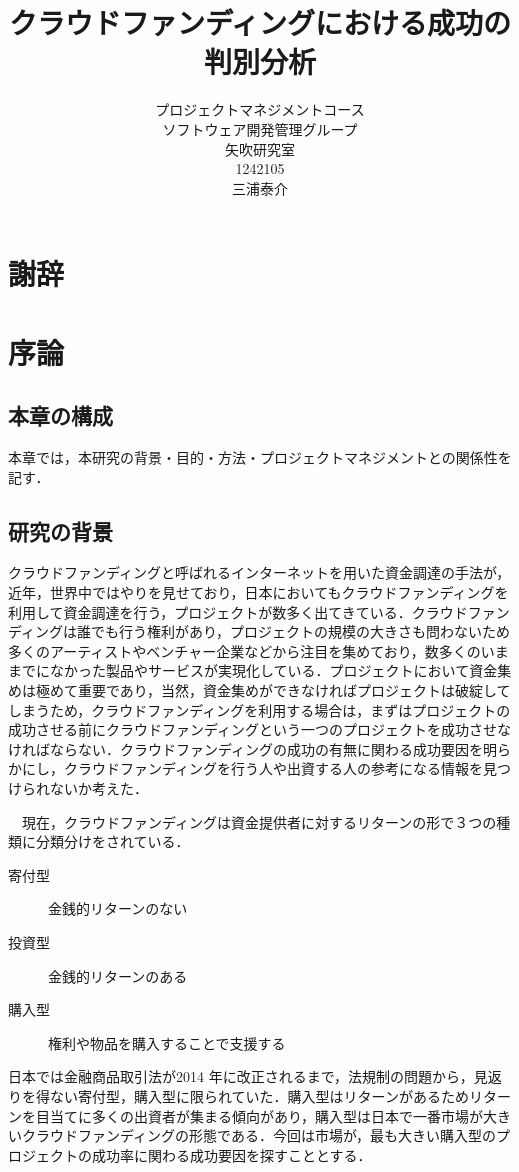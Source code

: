 \title{クラウドファンディングにおける成功の判別分析}
\author{プロジェクトマネジメントコース\\
ソフトウェア開発管理グループ\\
矢吹研究室\\
1242105\\
三浦泰介}
\date{}

\maketitle

\chapter*{謝辞}

\tableofcontents%

\chapter{序論}
\section{本章の構成}
本章では，本研究の背景・目的・方法・プロジェクトマネジメントとの関係性を記す．
\section{研究の背景}
クラウドファンディングと呼ばれるインターネットを用いた資金調達の手法が，近年，世界中ではやりを見せており，日本においてもクラウドファンディングを利用して資金調達を行う，プロジェクトが数多く出てきている．クラウドファンディングは誰でも行う権利があり，プロジェクトの規模の大きさも問わないため多くのアーティストやベンチャー企業などから注目を集めており，数多くのいままでになかった製品やサービスが実現化している．プロジェクトにおいて資金集めは極めて重要であり，当然，資金集めができなければプロジェクトは破綻してしまうため，クラウドファンディングを利用する場合は，まずはプロジェクトの成功させる前にクラウドファンディングという一つのプロジェクトを成功させなければならない．クラウドファンディングの成功の有無に関わる成功要因を明らかにし，クラウドファンディングを行う人や出資する人の参考になる情報を見つけられないか考えた．

　現在，クラウドファンディングは資金提供者に対するリターンの形で３つの種類に分類分けをされている．
\begin{description}
 \item[寄付型] 金銭的リターンのない
 \item[投資型] 金銭的リターンのある
 \item[購入型] 権利や物品を購入することで支援する
\end{description}
日本では金融商品取引法が2014 年に改正されるまで，法規制の問題から，見返りを得ない寄付型，購入型に限られていた．購入型はリターンがあるためリターンを目当てに多くの出資者が集まる傾向があり，購入型は日本で一番市場が大きいクラウドファンディングの形態である．今回は市場が，最も大きい購入型のプロジェクトの成功率に関わる成功要因を探すこととする．

